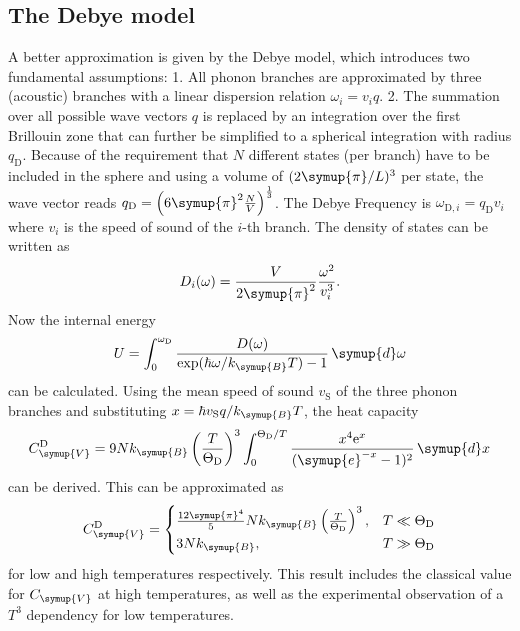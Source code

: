\subsection{The Debye model}
A better approximation is given by the Debye model, which introduces two fundamental assumptions: 1. All phonon branches are approximated by three (acoustic) branches with
a linear dispersion relation $\omega_i = v_i q$. 2. The summation over all possible wave vectors $q$ is replaced by an integration over the first Brillouin zone that can further
be simplified to a spherical integration with radius $q_\text{D}$. Because of the requirement that $N$ different states (per branch) have to be included in the sphere and using a
volume of $(2\symup{\pi}/L)^3$ per state, the wave vector reads $q_\text{D} = \left(6\symup{\pi}^2 \frac{N}{V}\right)^{\frac{1}{3}}$.
The Debye Frequency is $\omega_{\text{D}, i} = q_\text{D} v_i$ where $v_i$ is the speed of sound of the $i$-th branch.
The density of states can be written as
\begin{equation*}
    D_i(\omega) = \frac{V}{2\symup{\pi}^2}\frac{\omega^2}{v^3_i}.
\end{equation*}
Now the internal energy
\begin{equation*}
    U = \int^{\omega_\text{D}}_{0} \frac{D(\omega)}{\mathrm{exp}(\hbar\omega / k_{\symup{B}} T) -1} \,\symup{d}\omega
\end{equation*}
can be calculated.
Using the mean speed of sound $v_\text{S}$ of the three phonon branches and substituting $x = \hbar v_\text{S} q /k_{\symup{B}} T$, the heat capacity
\begin{equation}
    \label{eqn:CV_Debye}
    C^\text{D}_{\symup{V}} = 9N k_{\symup{B}} \left(\frac{T}{\Theta_\text{D}}\right)^3 \int^{\Theta_\text{D}/T}_{0} \frac{x^4 \mathrm{e}^x}{(\symup{e}^{-x} -1)^2} \, \symup{d}x
\end{equation}
can be derived.
This can be approximated as
\begin{equation*}
    C^\text{D}_{\symup{V}} =
    \begin{cases}
        \frac{12\symup{\pi}^4}{5}Nk_{\symup{B}} \left(\frac{T}{\Theta_\text{D}}\right)^3, & T \ll \Theta_\text{D}\\
        3Nk_{\symup{B}}, & T \gg \Theta_\text{D}\\
    \end{cases}
\end{equation*}
for low and high temperatures respectively. This result includes the classical value for $C_{\symup{V}}$ at high temperatures, as well as the experimental observation of
a $T^3$ dependency for low temperatures.
